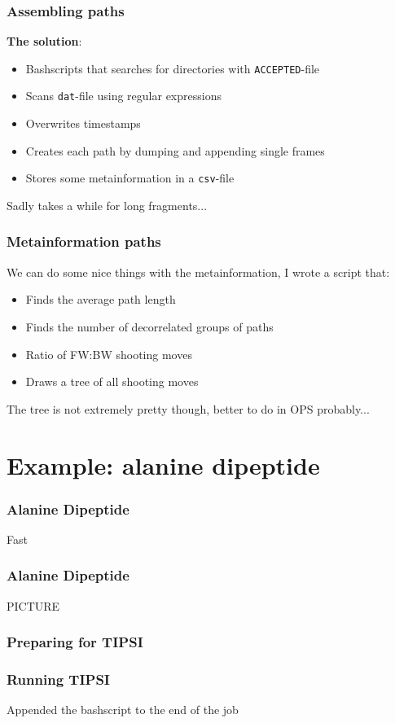 \documentclass[hyperref={pdfpagelabels=false}]{beamer}
\begin{document}
\begin{frame}
\frametitle{Assembling paths}
\textbf{The solution}: 
\begin{itemize}
\item Bashscripts that searches for directories with \texttt{ACCEPTED}-file
\item Scans \texttt{dat}-file using regular expressions
\item Overwrites timestamps
\item Creates each path by dumping and appending single frames
\item Stores some metainformation in a \texttt{csv}-file
\end{itemize}
Sadly takes a while for long fragments...
\end{frame}

\begin{frame}
\frametitle{Metainformation paths} 
We can do some nice things with the metainformation, I wrote a script that:
\begin{itemize}
\item Finds the average path length
\item Finds the number of decorrelated groups of paths
\item Ratio of FW:BW shooting moves
\item Draws a tree of all shooting moves
\end{itemize}
The tree is not extremely pretty though, better to do in OPS probably...
\end{frame}

\section{Example: alanine dipeptide} 
\setcounter{subsection}{1}

\begin{frame}
\frametitle{Alanine Dipeptide} 
Fast
\end{frame}

\begin{frame}
\frametitle{Alanine Dipeptide} 
PICTURE
\end{frame}

\begin{frame}
\frametitle{Preparing for \textsc{TIPSI}} 
\end{frame}

\begin{frame}
\frametitle{Running \textsc{TIPSI}} 

Appended the bashscript to the end of the job
\end{frame}
\end{document}
